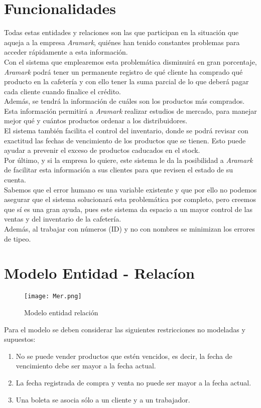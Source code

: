 \documentclass[12pt]{article}
\begin{document}
	\section{Funcionalidades}
Todas estas entidades y relaciones son las que participan en la situaci\'on que aqueja a la empresa \textit{Aramark}, qui\'enes han tenido constantes problemas para acceder r\'apidamente a esta informaci\'on.\\
Con el sistema que emplearemos esta problem\'atica disminuir\'a en gran porcentaje, \textit{Aramark} podr\'a tener un permanente registro de qu\'e cliente ha comprado qu\'e producto en la cafeter\'ia y con ello tener la suma parcial de lo que deber\'a pagar cada cliente cuando finalice el cr\'edito.\\
Adem\'as, se tendr\'a la informaci\'on de cu\'ales son los productos m\'as comprados. Esta informaci\'on permitir\'a a \textit{Aramark} realizar estudios de mercado, para manejar mejor qu\'e y cu\'antos productos ordenar a los distribuidores.\\
El sistema tambi\'en facilita el control del inventario, donde se podr\'a revisar con exactitud las fechas de vencimiento de los productos que se tienen. Esto puede ayudar a prevenir el exceso de productos caducados en el stock. \\
Por \'ultimo, y si la empresa lo quiere, este sistema le da la posibilidad a \textit{Aramark} de facilitar esta informaci\'on a sus clientes para que revisen el estado de su cuenta.\\
Sabemos que el error humano es una variable existente y que por ello no podemos asegurar que el sistema solucionar\'a esta problem\'atica por completo, pero creemos que s\'i es una gran ayuda, pues este sistema da espacio a un mayor control de las ventas y del inventario de la cafeter\'ia. \\
Adem\'as, al trabajar con n\'umeros (ID) y no con nombres se minimizan los errores de tipeo.
	\newpage
	\section{Modelo Entidad - Relac\'ion}
	\begin{figure}[h!]
  	\texttt{[image: Mer.png]}
  	\caption{Modelo entidad relaci\'on}
  	\label{fig:Mer}
	\end{figure}
Para el modelo se deben considerar las siguientes restricciones no modeladas y supuestos:
	\begin{enumerate}
\item No se puede vender productos que est\'en vencidos, es decir,  la fecha de vencimiento debe ser mayor a la fecha actual.   
\item La fecha registrada de compra y venta no puede ser mayor a la fecha actual. 
\item Una boleta se asocia s\'olo a un cliente y a un trabajador. 	
	\end{enumerate} 
	
\end{document}
